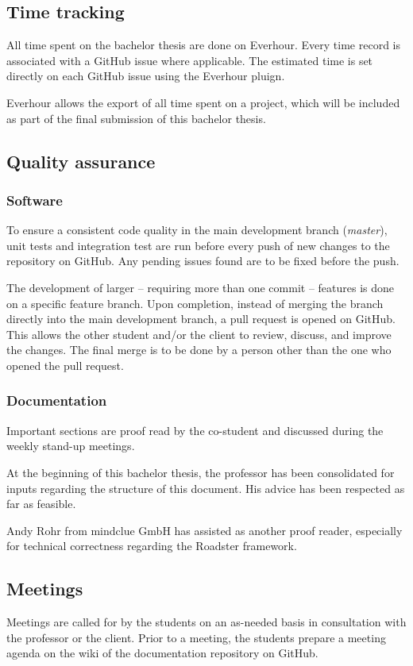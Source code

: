 \subsection{Time tracking}
All time spent on the bachelor thesis are done on Everhour. Every time record
is associated with a GitHub issue where applicable.
The estimated time is set directly on each GitHub issue using the Everhour pluign.

Everhour allows the export of all time spent on a project, which will be
included as part of the final submission of this bachelor thesis.

\subsection{Quality assurance}


\subsubsection{Software}
To ensure a consistent code quality in the main development branch
(\emph{master}), unit tests and integration test are run before every push of
new changes to the repository on GitHub. Any pending issues found are to be
fixed before the push.


The development of larger -- requiring more than one commit -- features is done
on a specific feature branch.  Upon completion, instead of merging the branch
directly into the main development branch, a pull request is opened on GitHub.
This allows the other student and/or the client to review, discuss, and improve
the changes. The final merge is to be done by a person other than the one who
opened the pull request.

\subsubsection{Documentation}
Important sections are proof read by the co-student and discussed during the
weekly stand-up meetings.

At the beginning of this bachelor thesis, the professor has been consolidated
for inputs regarding the structure of this document. His advice has been
respected as far as feasible.

Andy Rohr from mindclue GmbH has assisted as another proof reader, especially
for technical correctness regarding the Roadster framework.


\subsection{Meetings}
Meetings are called for by the students on an as-needed basis in consultation
with the professor or the client. Prior to a meeting, the students prepare a meeting
agenda on the wiki of the documentation repository on GitHub.


